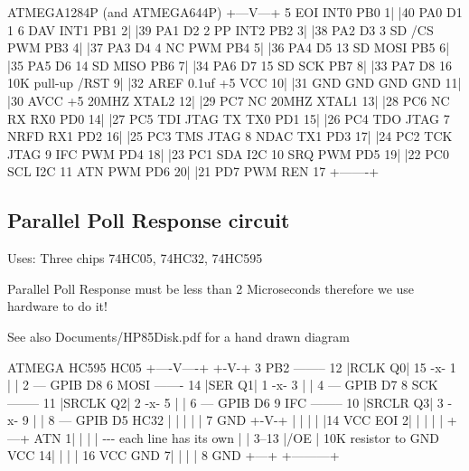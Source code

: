\begin{DoxyItemize}
\begin{DoxyPre}                       ATMEGA1284P (and ATMEGA644P) 
                       +---V---+ 
     5 EOI INT0  PB0  1|       |40  PA0      D1  1 
     6 DAV INT1  PB1  2|       |39  PA1      D2  2 
       PP  INT2  PB2  3|       |38  PA2      D3  3 
    SD /CS  PWM  PB3  4|       |37  PA3      D4  4 
       NC   PWM  PB4  5|       |36  PA4      D5 13 
    SD     MOSI  PB5  6|       |35  PA5      D6 14 
    SD     MISO  PB6  7|       |34  PA6      D7 15 
    SD      SCK  PB7  8|       |33  PA7      D8 16 
    10K pull-up  /RST  9|       |32  AREF     0.1uf 
       +5        VCC 10|       |31  GND      GND   
       GND       GND 11|       |30  AVCC     +5    
    20MHZ      XTAL2 12|       |29  PC7      NC    
    20MHZ      XTAL1 13|       |28  PC6      NC    
       RX   RX0  PD0 14|       |27  PC5  TDI JTAG 
       TX   TX0  PD1 15|       |26  PC4  TDO JTAG 
     7 NRFD RX1  PD2 16|       |25  PC3  TMS JTAG 
     8 NDAC TX1  PD3 17|       |24  PC2  TCK JTAG 
     9 IFC  PWM  PD4 18|       |23  PC1  SDA I2C   
    10 SRQ  PWM  PD5 19|       |22  PC0  SCL I2C  
    11 ATN  PWM  PD6 20|       |21  PD7  PWM REN 17 
                       +-------+ 
\end{DoxyPre}

\end{DoxyItemize}





\subsection*{Parallel Poll Response circuit}


\begin{DoxyItemize}
\item Uses\+: Three chips 74\+H\+C05, 74\+H\+C32, 74\+H\+C595
\item Parallel Poll Response must be less than 2 Microseconds therefore we use hardware to do it!
\item \begin{DoxySeeAlso}{See also}
Documents/\+H\+P85\+Disk.\+pdf for a hand drawn diagram
\end{DoxySeeAlso}

\begin{DoxyPre}
    ATMEGA               HC595             HC05 
                      +----V----+          +-V-+  
    3 PB2 -------- 12 |RCLK   Q0| 15 -x- 1 |   | 2 --- GPIB D8 
    6 MOSI ------- 14 |SER    Q1| 1  -x- 3 |   | 4 --- GPIB D7 
    8 SCK -------- 11 |SRCLK  Q2| 2  -x- 5 |   | 6 --- GPIB D6 
    9 IFC -------- 10 |SRCLR  Q3| 3  -x- 9 |   | 8 --- GPIB D5 
           HC32       |         |     |    |   | 7 GND 
          +-V-+       |         |     |    |   |14 VCC 
     EOI 2|   |       |         |     |    +---+ 
     ATN 1|   |       |         |     -\/-\/-\/ each line has its own 
          |   | 3--13 |/OE      |          10K resistor to GND 
    VCC 14|   |       |         | 16 VCC 
    GND  7|   |       |         |  8 GND 
          +---+       +---------+ 
\end{DoxyPre}

\end{DoxyItemize}

